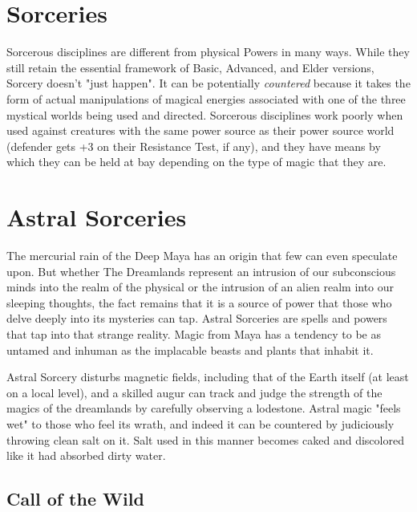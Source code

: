 \section{Sorceries}
\hspace{\parindent} Sorcerous disciplines are different from physical Powers in many ways. While they still retain the essential framework of Basic, Advanced, and Elder versions, Sorcery doesn't "just happen". It can be potentially \textit{countered} because it takes the form of actual manipulations of magical energies associated with one of the three mystical worlds being used and directed. Sorcerous disciplines work poorly when used against creatures with the same power source as their power source world (defender gets +3 on their Resistance Test, if any), and they have means by which they can be held at bay depending on the type of magic that they are.

\section{Astral Sorceries}

\hspace{\parindent} The mercurial rain of the Deep Maya has an origin that few can even speculate upon. But whether The Dreamlands represent an intrusion of our subconscious minds into the realm of the physical or the intrusion of an alien realm into our sleeping thoughts, the fact remains that it is a source of power that those who delve deeply into its mysteries can tap. Astral Sorceries are spells and powers that tap into that strange reality. Magic from Maya has a tendency to be as untamed and inhuman as the implacable beasts and plants that inhabit it.

Astral Sorcery disturbs magnetic fields, including that of the Earth itself (at least on a local level), and a skilled augur can track and judge the strength of the magics of the dreamlands by carefully observing a lodestone.  Astral magic "feels wet" to those who feel its wrath, and indeed it can be countered by judiciously throwing clean salt on it. Salt used in this manner becomes caked and discolored like it had absorbed dirty water.

\subsection{Call of the Wild}

